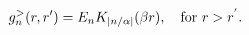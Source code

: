 \begin{equation}
g^>_n(r,r')=E_n K_{|n/\alpha|}(\beta r), 
\quad \hbox{for $r>r^{'}$.}
\label{22} 
\end{equation}

